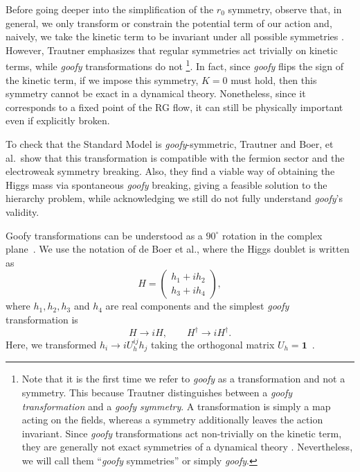 \documentclass[a4paper, 11pt]{article}
\begin{document}
Before going deeper into the simplification of the $r_0$ symmetry, observe that, in general, we only transform or constrain the potential term of our action and, naively, we take the kinetic term to be invariant under all possible symmetries \cite{TrautnerGoofy}. However, Trautner emphasizes that regular symmetries act trivially on kinetic terms, while \textit{goofy} transformations do not%
\footnote{Note that it is the first time we refer to \textit{goofy} as a transformation and not a symmetry. This because Trautner distinguishes between a \emph{goofy transformation} and a \emph{goofy symmetry}. A transformation is simply a map acting on the fields, whereas a symmetry additionally leaves the action invariant. Since \textit{goofy} transformations act non-trivially on the kinetic term, they are generally not exact symmetries of a dynamical theory  \cite{TrautnerGoofy}. Nevertheless, we will call them ``\textit{goofy} symmetries'' or simply \textit{goofy}.}. %
In fact, since \textit{goofy} flips the sign of the kinetic term, if we impose this symmetry, $K=0$ must hold, then this symmetry cannot be exact in a dynamical theory. Nonetheless, since it corresponds to a fixed point of the RG flow, it can still be physically important even if explicitly broken.

To check that the Standard Model is \textit{goofy}-symmetric, Trautner and Boer, et al.\ show that this transformation is compatible with the fermion sector and the electroweak symmetry breaking. Also, they find a viable way of obtaining the Higgs mass via spontaneous \textit{goofy} breaking, giving a feasible solution to the hierarchy problem, while acknowledging we still do not fully understand \textit{goofy}'s validity.

Goofy transformations can be understood as a $90^\circ$ rotation in the complex plane~\cite{goofy2}. We use the notation of de Boer et al., where the Higgs doublet is written as
\begin{equation*}
    H=\begin{pmatrix}
        h_1+ih_2 \\
        h_3+ih_4
    \end{pmatrix},
\end{equation*}
where $h_1, h_2, h_3$ and $h_4$ are real components and the simplest \textit{goofy} transformation is~\cite{goofy2}
\begin{equation*}
H \rightarrow iH,
\qquad
H^\dagger \rightarrow iH^\dagger.
\end{equation*}
Here, we transformed $h_i\to iU^{ij}_h h_j$ taking the orthogonal matrix $U_h=\mathbf{1}$~\cite{goofy2}.
\end{document}
